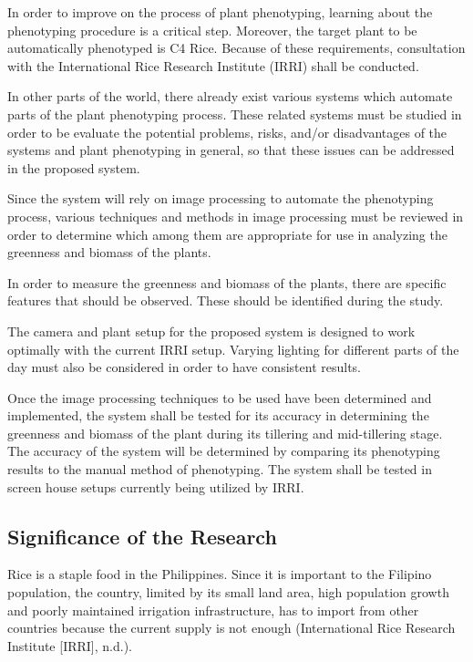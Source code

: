 In order to improve on the process of plant phenotyping, learning about the phenotyping procedure is a critical step. Moreover, the target plant to be automatically phenotyped is C4 Rice. Because of these requirements, consultation with the International Rice Research Institute (IRRI) shall be conducted. 

	In other parts of the world, there already exist various systems which automate parts of the plant phenotyping process. These related systems must be studied in order to be evaluate the potential problems, risks, and/or disadvantages of the systems and plant phenotyping in general, so that these issues can be addressed in the proposed system.

	Since the system will rely on image processing to automate the phenotyping process, various techniques and methods in image processing must be reviewed in order to determine which among them are appropriate for use in analyzing the greenness and biomass of the plants.

	In order to measure the greenness and biomass of the plants, there are specific features that should be observed.  These should be identified during the study.

	The camera and plant setup for the proposed system is designed to work optimally with the current IRRI setup. Varying lighting for different parts of the day must also be considered in order to have consistent results.

	Once the image processing techniques to be used have been determined and implemented, the system shall be tested for its accuracy in determining the greenness and biomass of the plant during its tillering and mid-tillering stage. The accuracy of the system will be determined by comparing its phenotyping results to the manual method of phenotyping. The system shall be tested in screen house setups currently being utilized by IRRI.

\subsection{Significance of the Research}
\label{sec:significance}

Rice is a staple food in the Philippines. Since it is important to the Filipino population, the country, limited by its small land area, high population growth and poorly maintained irrigation infrastructure, has to import from other countries because the current supply is not enough (International Rice Research Institute [IRRI], n.d.). 

